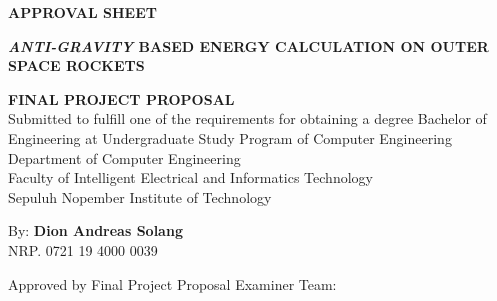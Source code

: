 \begin{center}
	\large
  \textbf{APPROVAL SHEET}
\end{center}

\thispagestyle{empty}

\begin{center}
  \textbf{\emph{ANTI-GRAVITY} BASED ENERGY CALCULATION ON OUTER SPACE ROCKETS}
\end{center}

\begingroup
  \small

  \begin{center}
    \textbf{FINAL PROJECT PROPOSAL} \\
    Submitted to fulfill one of the requirements for obtaining a degree
    Bachelor of Engineering at 
    Undergraduate Study Program of Computer Engineering \\
    Department of Computer Engineering \\
    Faculty of Intelligent Electrical and Informatics Technology\\
    Sepuluh Nopember Institute of Technology
  \end{center}

  \begin{center}
    By: \textbf{Dion Andreas Solang} \\
    NRP. 0721 19 4000 0039
  \end{center}

  \begin{center}
    Approved by Final Project Proposal Examiner Team:
  \end{center}

  \begingroup
    \setlength{\tabcolsep}{0pt}

